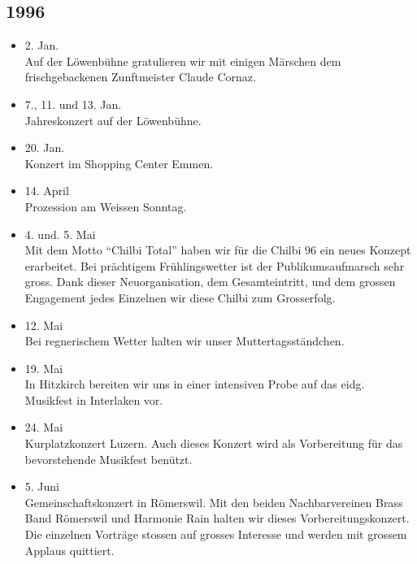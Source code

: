 \subsection{1996}

\begin{history}


    \begin{itemize}

        \item 2. Jan.\\
              Auf der Löwenbühne gratulieren wir mit einigen Märschen dem
              frischgebackenen Zunftmeister Claude Cornaz.

        \item 7., 11. und 13. Jan.\\
              Jahreskonzert auf der Löwenbühne.

        \item 20. Jan.\\
              Konzert im Shopping Center Emmen.

        \item 14. April\\
              Prozession am Weissen Sonntag.

        \item 4. und. 5. Mai\\
              Mit dem Motto \enquote{Chilbi Total} haben wir für die Chilbi 96 ein
              neues Konzept erarbeitet. Bei prächtigem Frühlingswetter ist der
              Publikumsaufmarsch sehr gross. Dank dieser Neuorganisation, dem
              Gesamteintritt, und dem grossen Engagement jedes Einzelnen wir diese
              Chilbi zum Grosserfolg.

        \item 12. Mai\\
              Bei regnerischem Wetter halten wir unser Muttertagsständchen.

        \item 19. Mai\\
              In Hitzkirch bereiten wir uns in einer intensiven Probe auf das eidg.
              Musikfest in Interlaken vor.

        \item 24. Mai\\
              Kurplatzkonzert Luzern. Auch dieses Konzert wird als Vorbereitung für
              das bevorstehende Musikfest benützt.

        \item 5. Juni\\
              Gemeinschaftskonzert in Römerswil. Mit den beiden Nachbarvereinen Brass
              Band Römerswil und Harmonie Rain halten wir dieses Vorbereitungskonzert.
              Die einzelnen Vorträge stossen auf grosses Interesse und werden mit
              grossem Applaus quittiert.


\end{itemize}
\end{history}
